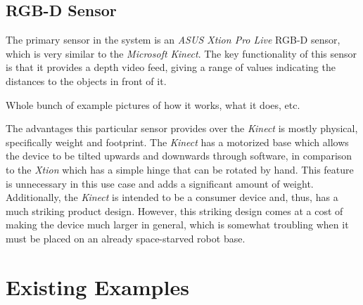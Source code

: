\subsection{RGB-D Sensor}
The primary sensor in the system is an \emph{ASUS Xtion Pro Live} RGB-D sensor, which is very similar to the \emph{Microsoft Kinect}. The key functionality of this sensor is that it provides a depth video feed, giving a range of values indicating the distances to the objects in front of it.

Whole bunch of example pictures of how it works, what it does, etc.

The advantages this particular sensor provides over the \emph{Kinect} is mostly physical, specifically weight and footprint. The \emph{Kinect} has a motorized base which allows the device to be tilted upwards and downwards through software, in comparison to the \emph{Xtion} which has a simple hinge that can be rotated by hand. This feature is unnecessary in this use case and adds a significant amount of weight. Additionally, the \emph{Kinect} is intended to be a consumer device and, thus, has a much striking product design. However, this striking design comes at a cost of making the device much larger in general, which is somewhat troubling when it must be placed on an already space-starved robot base.


\section{Existing Examples}